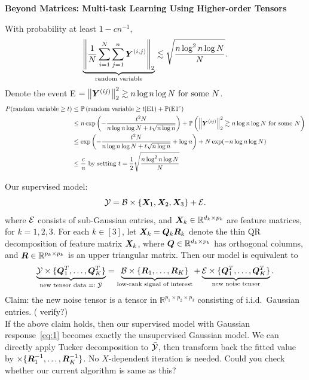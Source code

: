 \documentclass[10pt]{article}
\newcommand*{\KeepStyleUnderBrace}[1]{%
  \mathop{%
    \mathchoice
    {\underbrace{\displaystyle#1}}%
    {\underbrace{\textstyle#1}}%
    {\underbrace{\scriptstyle#1}}%
    {\underbrace{\scriptscriptstyle#1}}%
  }\limits
}
\theoremstyle{definition}
\theoremstyle{definition}
\theoremstyle{definition}
\begin{document}
\begin{center}
{\bf \large Beyond Matrices: Multi-task Learning Using Higher-order Tensors}\\
\vspace{.3cm}
\end{center}
With probability at least $1-cn^{-1}$, 
\[
\KeepStyleUnderBrace{\norm{{1\over N}\sum_{i=1}^N\sum_{j=1}^n \mY^{(i,j)}}_2}_{\text{random variable}} \lesssim \sqrt{n\log^2 n\log N \over N}.
\]
Denote the event E $=\left\lVert\bm Y^{(ij)}\right\rVert_2^2 \gtrsim n \log n \log N \text{ for some }N$.
\begin{align}
P (\text{random variable} \geq t)&\leq \mathbb{P}\left( \text{random variable} \geq t | \text{E1}\right) + \mathbb{P}(\text{E1}^c)\\
 &\leq n\exp\left(-{t^2N \over n \log n \log N + t\sqrt{n\log n}}\right)+  \mathbb{P}\left(\left\lVert\bm Y^{(ij)}\right\rVert_2^2 \gtrsim n \log n \log N \text{ for some }N\right )\\
 &\leq \exp\left(-{t^2 N \over n \log n \log N+ t\sqrt{n\log n}}+\log n\right)+  N \exp(- n \log n \log N)\\
 &\leq {c\over n}  \text{ by setting $t={1\over 2}\sqrt{n\log^2n\log N\over N}$}
\end{align}

Our supervised model:
\begin{equation}\label{eq:1}
\mathcal{Y}=\mathcal{B}\times\{\bm X_1,\bm X_2,\bm X_3\}+\mathcal{E}.
\end{equation}
where $\mathcal{E}$ consists of sub-Gaussian entries, and $\bm X_k\in\mathbb{R}^{d_k\times p_k}$ are feature matrices, for $k=1,2,3$. For each $k\in[3]$, let $\bm X_k=\bm{Q}_k\bm{R}_k$ denote the thin QR decomposition of feature matrix $\bm X_k$, where $\bm{Q}\in\mathbb{R}^{d_k\times p_k}$ has orthogonal columns, and $\bm{R}\in\mathbb{R}^{p_k\times p_k} $ is an upper triangular matrix. Then our model is equivalent to
\[
\KeepStyleUnderBrace{\tY\times\{\mQ^T_1, \ldots,\mQ^T_K\}}_{\text{new tensor data $=:\bar \tY$}}=\KeepStyleUnderBrace{\tB\times\{\mR_1,\ldots,\mR_K\}}_{\text{low-rank signal of interest}}+\KeepStyleUnderBrace{\tE\times\{\mQ^T_1,\ldots,\mQ^T_K\}}_{\text{new noise tensor}}.
\]
Claim: the new noise tensor is a tensor in $\mathbb{R}^{p_1\times p_2\times p_3}$ consisting of i.i.d.\ Gaussian entries. ({\color{red} verify?})\\
If the above claim holds, then our supervised model with Gaussian response~\eqref{eq:1} becomes exactly the unsupervised Gaussian model. We can directly apply Tucker decomposition to $\bar {\mathcal{Y}}$, then transform back the fitted value by $\times\{\bm{R}^{-1}_1,\ldots,\bm{R}^{-1}_K\}$. No $X$-dependent iteration is needed. Could you check whether our current algorithm is same as this?  
\end{document}
